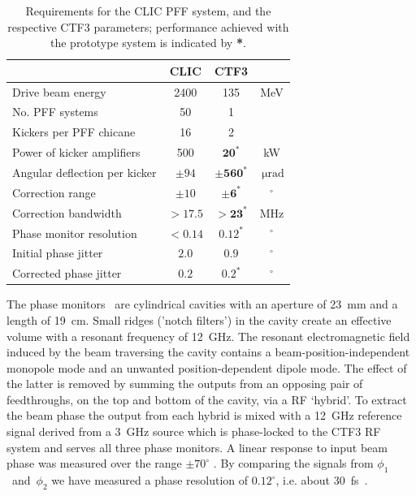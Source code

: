 \documentclass[%
 reprint,
 superscriptaddress,
 amsmath,
 amssymb,
 prl,
]{revtex4-1}
\begin{document}
\begin{table}
	\caption{\label{tab:pffspecs}
	    Requirements for the CLIC PFF system, and the respective CTF3 
	    parameters; performance achieved with the prototype system is indicated 
	    by \textbf{*}.}
\begin{ruledtabular}
	\begin{tabular}{lccc}
		 & CLIC & CTF3 \\
		\hline
		Drive beam energy & 2400 & 135 & MeV \\
		No. PFF systems & 50 & 1 & \\
		Kickers per PFF chicane & 16 & 2 & \\
		Power of kicker amplifiers & 500 & \(\mathbf{20^*}\) & kW \\
		Angular deflection per kicker & \(\pm94\) & 
		\(\mathbf{\pm560^*}\) & \(~\mathrm{\mu rad}\) \\
		Correction range & \(\pm 10\) & \(\mathbf{\pm 6^*}\) & \(^\circ\) \\
		Correction bandwidth & \(>17.5\) & \(\mathbf{>23^*}\) & MHz \\
		Phase monitor resolution & \(< 0.14\) & \(\mathbf{0.12^*}\) &  
		\(^\circ\)   \\
		Initial phase jitter & \(2.0\) & \(0.9\) &  \(^\circ\) \\
		Corrected phase jitter & \(0.2\) & \(\mathbf{0.2^*}\) &  \(^\circ\)  \\
	\end{tabular}
\end{ruledtabular}
\end{table}


The phase monitors~\cite{phMonEuCard} are cylindrical cavities with an aperture 
of 23~mm and a length of 19~cm. Small ridges (’notch filters’) in the cavity 
create an effective volume with a resonant frequency of 12~GHz. 
The resonant electromagnetic field induced by the beam traversing the cavity 
contains a beam-position-independent monopole mode and an unwanted 
position-dependent dipole mode. The 
effect of the latter is removed by summing the outputs from an opposing pair 
of feedthroughs, on the top and bottom of the cavity, via a RF ‘hybrid’. 
To extract the beam phase the output from each hybrid 
is mixed with a 12~GHz reference signal derived from a 3~GHz source which is 
phase-locked to the CTF3 RF system and serves all three phase monitors.
A linear response to input beam phase was measured over the range 
\(\pm70^\circ\) \cite{Skowron2013}. By comparing the signals from 
\(\phi_1\)~and~\(\phi_2\) we have measured a phase resolution of 
\(0.12^\circ\), i.e. about 30~fs~\cite{RobertsThesis}.
\end{document}
